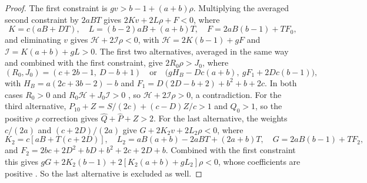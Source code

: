 \begin{proof}
The first constraint is $gv>b-1+(a+b)\rho$. Multiplying the averaged
second constraint by $2aBT$ gives $2Kv+2L\rho+F<0$, where
\[
 K=c(aB+DT),\quad L=(b-2)aB+(a+b)T,\quad F=2aB(b-1)+TF_0,
\]
and eliminating $v$ gives $\mathcal H+2\mathcal I\rho<0$, with
$\mathcal H=2K(b-1)+gF$ and $\mathcal I=K(a+b)+gL>0$.
The first two alternatives, averaged in the same way and combined
with the first constraint, give $2R_0\rho>J_0$, where
\[
 (R_0,J_0)=(c+2b-1,\ D-b+1)\quad\text{or}\quad
 \bigl(gH_B-Dc(a+b),\ gF_1+2Dc(b-1)\bigr),
\]
with $H_B=a(2c+3b-2)-b$ and $F_1=D(2D-b+2)+b^2+b+2c$. In both cases
$R_0>0$ and $R_0\mathcal H+J_0\mathcal I>0$ , so
$\mathcal H+2\mathcal I\rho>0$, a contradiction.
For the third alternative,
$P_{10}+Z=S/(2c)+(c-D)Z/c>1$ and $Q_0>1$, so the positive $\rho$
correction gives $\widehat Q+\widehat P+Z>2$.
For the last alternative, the weights $c/(2a)$ and $(c+2D)/(2a)$ give
$G+2K_2v+2L_2\rho<0$, where
\[
 K_2=c[aB+T(c+2D)],\quad
 L_2=aB(a+b)-2aBT+(2a+b)T,\quad G=2aB(b-1)+TF_2,
\]
and $F_2=2bc+2D^2+bD+b^2+2c+2D+b$. Combined with the first constraint
this gives $gG+2K_2(b-1)+2[K_2(a+b)+gL_2]\rho<0$, whose
coefficients are positive . So the last alternative is excluded as well.
\end{proof}


